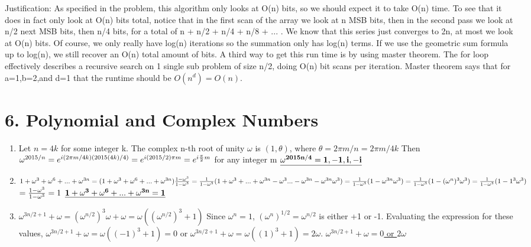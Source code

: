 \documentclass[11pt]{article}
\newenvironment{qparts}{\begin{enumerate}[{(}a{)}]}{\end{enumerate}}
\begin{document}
Justification:\newline
As specified in the problem, this algorithm only looks at O(n) bits, so we should expect it to take O(n) time. To see that it does in fact only look at O(n) bits total, notice that in the first scan of the array we look at n MSB bits, then in the second pass we look at n/2 next MSB bits, then n/4 bits, for a total of n + n/2 + n/4 + n/8 + ... . We know that this series just converges to 2n, at most we look at O(n) bits. Of course, we only really have log(n) iterations so the summation only has log(n) terms. If we use the geometric sum formula up to log(n), we still recover an O(n) total amount of bits. A third way to get this run time is by using master theorem. The for loop effectively describes a recursive search on 1 single sub problem of size n/2, doing O(n) bit scans per iteration. Master theorem says that for a=1,b=2,and d=1 that the runtime should be $O(n^d)= O(n)$.
\newline


\newpage
\section*{6. Polynomial and Complex Numbers}
\begin{qparts}
\item
Let $n = 4k$ for some integer k. The complex n-th root of unity $\omega$ is $(1, \theta)$, where $\theta = 2\pi m / n = 2\pi m / {4k}$ Then $\omega^{2015/n} = e^{i(2\pi m/4k)(2015(4k)/4)} = e^{i(2015/2)\pi m} = e^{i {\pi \over 2} m}$ for any integer m\newline
$\bf{\underline{\omega^{2015n/4} =  1, -1, i, -i}}$


\item
$1 + \omega^3 + \omega^6 + ... + \omega^{3n} = (1 + \omega^3 + \omega^6 + ... + \omega^{3n}){{1-\omega^3}\over{1-\omega^3}} = {1\over{1-\omega^3}}(1+\omega^3+...+\omega^{3n}-\omega^3 ... -\omega^{3n} - \omega^{3n}\omega^3) = {1\over{1-\omega^3}}(1-\omega^{3n}\omega^3) = {1\over{1-\omega^3}}(1 - (\omega^n)^3 \omega^3) = {1\over{1-\omega^3}} (1-1^3 \omega^3)$\newline
$ = {{1-\omega^3} \over {1-\omega^3}} = 1$\newline
$\underline{\bf{1 + \omega^3 + \omega^6 + ... + \omega^{3n} = 1}}$


\item
$\omega^{3n/2 + 1} + \omega  = (\omega ^{n/2})^3 \omega + \omega = \omega((\omega ^{n/2})^3 + 1)$\newline
Since $\omega^n = 1$, $(\omega^n)^{1/2}=\omega^{n/2}$ is either +1 or -1. Evaluating the expression for these values, $\omega^{3n/2 + 1} + \omega = \omega((-1)^3 + 1) = 0$ or $\omega^{3n/2 + 1} + \omega = \omega((1)^3 + 1) = 2\omega$.\newline
\underline{
$\omega^{3n/2 + 1} + \omega = 0$ or $2\omega$
}
\end{qparts}
\end{document}
